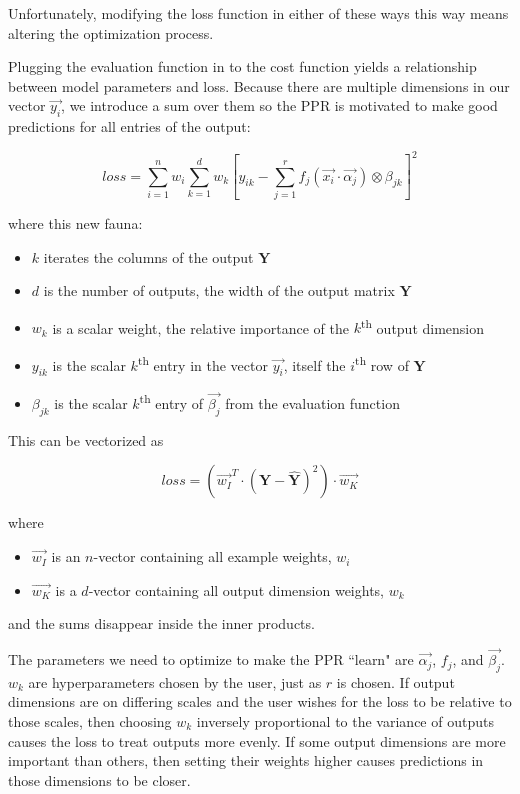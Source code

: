 \documentclass[12pt]{article}
\begin{document}
Unfortunately, modifying the loss function in either of these ways this way means altering the optimization process.\newline

Plugging the evaluation function in to the cost function yields a relationship between model parameters and loss. Because there are multiple dimensions in our vector $\vec{y_i}$, we introduce a sum over them so the PPR is motivated to make good predictions for all entries of the output:

$$loss = \sum_{i=1}^n w_i \sum_{k=1}^d w_k [y_{ik} - \sum_{j=1}^r f_j(\vec{x_i} \cdot \vec{\alpha_j}) \otimes \beta_{jk}]^2$$

where this new fauna:
\begin{itemize}
	\setlength\itemsep{-2mm}
	\item $k$ iterates the columns of the output $\pmb{Y}$
	\item $d$ is the number of outputs, the width of the output matrix $\pmb{Y}$
	\item $w_k$ is a scalar weight, the relative importance of the $k$\textsuperscript{th} output dimension
	\item $y_{ik}$ is the scalar $k$\textsuperscript{th} entry in the vector $\vec{y_i}$, itself the $i$\textsuperscript{th} row of $\pmb{Y}$
	\item $\beta_{jk}$ is the scalar $k$\textsuperscript{th} entry of $\vec{\beta_j}$ from the evaluation function
\end{itemize}

This can be vectorized as

$$loss = (\vec{w_I}^T \cdot (\pmb{Y} - \pmb{\hat{Y}})^2) \cdot \vec{w_K}$$

where
\begin{itemize}
	\setlength\itemsep{-2mm}
	\item $\vec{w_I}$ is an $n$-vector containing all example weights, $w_i$
	\item $\vec{w_K}$ is a $d$-vector containing all output dimension weights, $w_k$
\end{itemize}
and the sums disappear inside the inner products.\newline

The parameters we need to optimize to make the PPR ``learn" are $\vec{\alpha_j}$, $f_j$, and $\vec{\beta_j}$. $w_k$ are hyperparameters chosen by the user, just as $r$ is chosen. If output dimensions are on differing scales and the user wishes for the loss to be relative to those scales, then choosing $w_k$ inversely proportional to the variance of outputs causes the loss to treat outputs more evenly. If some output dimensions are more important than others, then setting their weights higher causes predictions in those dimensions to be closer.
\end{document}
